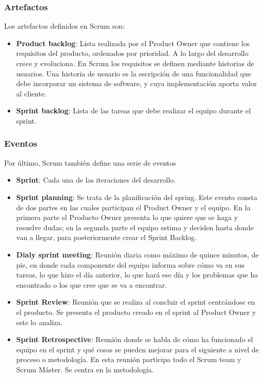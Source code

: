	\subsubsection{Artefactos}
	
	Los artefactos definidos en Scrum son:
	
	
	\begin{itemize}
		\item \textbf{Product backlog}: Lista realizada por el Product Owner que contiene los requisitos del producto, ordenados por prioridad. A lo largo del desarrollo crece y evoluciona. En Scrum los requisitos se definen mediante historias de usuarios. Una historia de usuario es la escripción de una funcionalidad que debe incorporar un sistema de software, y cuya implementación aporta valor al cliente.
		\item \textbf{Sprint backlog}: Lista de las tareas que debe realizar el equipo durante el sprint. 
	\end{itemize}
	
	\subsubsection{Eventos}
	Por último, Scrum también define una serie de eventos
	
	
	\begin{itemize}
		\item \textbf{Sprint}: Cada una de las iteraciones del desarrollo.
		\item \textbf{Sprint planning}: Se trata de la planificación del spring. Este evento consta de dos partes en las cuales participan el Product Owner y el equipo. En la primera parte el Producto Owner presenta lo que quiere que se haga y resuelve dudas; en la segunda parte el equipo estima y deciden hasta donde van a llegar, para posteriormente crear el Sprint Backlog.
		\item \textbf{Dialy sprint meeting}: Reunión diaria como máximo de quince minutos, de pie, en donde cada componente del equipo informa sobre cómo va en sus tareas, lo que hizo el día anterior, lo que hará ese día y los problemas que ha encontrado o los que cree que se va a encontrar.
		\item \textbf{Sprint Review}: Reunión que se realiza al concluir el sprint centrándose en el producto. Se presenta el producto creado en el sprint al Product Owner y este lo analiza.
		\item \textbf{Sprint Retrospective}: Reunión donde se habla de cómo ha funcionado el equipo en el sprint y qué cosas se pueden mejorar para el siguiente a nivel de proceso o metodología. En esta reunión participa todo el Scrum team y Scrum Máster. Se centra en la metodología.
	\end{itemize}
	
